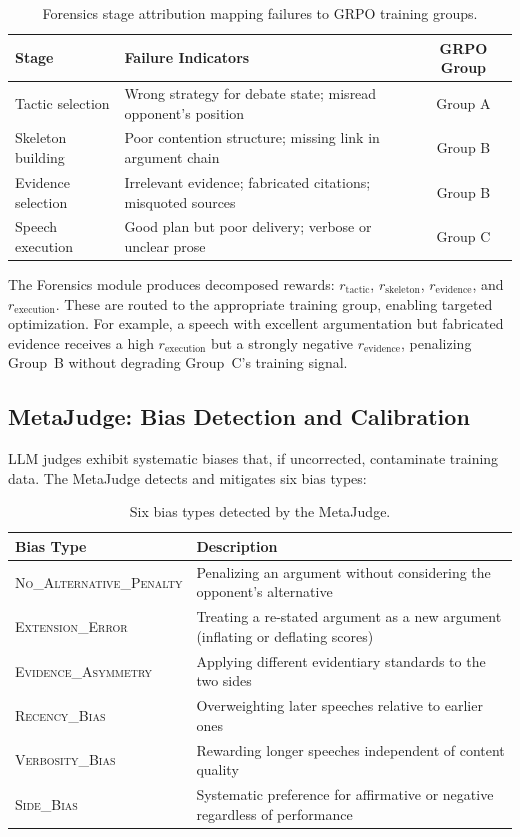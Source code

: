 \begin{table}[h]
\centering
\small
\begin{tabular}{lp{6cm}c}
\toprule
\textbf{Stage} & \textbf{Failure Indicators} & \textbf{GRPO Group} \\
\midrule
Tactic selection & Wrong strategy for debate state; misread opponent's position & Group A \\
Skeleton building & Poor contention structure; missing link in argument chain & Group B \\
Evidence selection & Irrelevant evidence; fabricated citations; misquoted sources & Group B \\
Speech execution & Good plan but poor delivery; verbose or unclear prose & Group C \\
\bottomrule
\end{tabular}
\caption{Forensics stage attribution mapping failures to GRPO training groups.}
\label{tab:forensics}
\end{table}

The Forensics module produces decomposed rewards:
$r_{\text{tactic}}$, $r_{\text{skeleton}}$, $r_{\text{evidence}}$,
and $r_{\text{execution}}$. These are routed to the appropriate training
group, enabling targeted optimization. For example, a speech with excellent
argumentation but fabricated evidence receives a high $r_{\text{execution}}$
but a strongly negative $r_{\text{evidence}}$, penalizing Group~B without
degrading Group~C's training signal.

\subsection{MetaJudge: Bias Detection and Calibration}

LLM judges exhibit systematic biases that, if uncorrected, contaminate
training data. The MetaJudge detects and mitigates six bias types:

\begin{table}[h]
\centering
\small
\begin{tabular}{lp{7cm}}
\toprule
\textbf{Bias Type} & \textbf{Description} \\
\midrule
\textsc{No\_Alternative\_Penalty} & Penalizing an argument without considering the opponent's alternative \\
\textsc{Extension\_Error} & Treating a re-stated argument as a new argument (inflating or deflating scores) \\
\textsc{Evidence\_Asymmetry} & Applying different evidentiary standards to the two sides \\
\textsc{Recency\_Bias} & Overweighting later speeches relative to earlier ones \\
\textsc{Verbosity\_Bias} & Rewarding longer speeches independent of content quality \\
\textsc{Side\_Bias} & Systematic preference for affirmative or negative regardless of performance \\
\bottomrule
\end{tabular}
\caption{Six bias types detected by the MetaJudge.}
\label{tab:bias_types}
\end{table}

